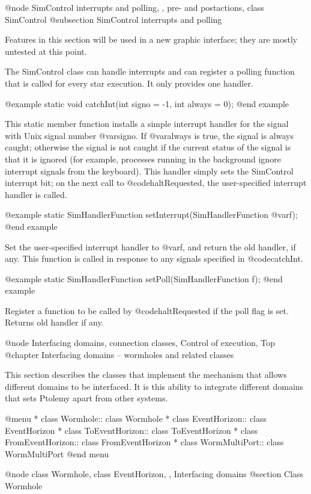@node SimControl interrupts and polling,  , pre- and postactions, class SimControl
@subsection SimControl interrupts and polling

Features in this section will be used in a new graphic interface;
they are mostly untested at this point.

The SimControl class can handle interrupts and can register a
polling function that is called for every star execution.
It only provides one handler.

@example
static void catchInt(int signo = -1, int always = 0);
@end example

This static member function installs a simple
interrupt handler for the signal with
Unix signal number @var{signo}.  If @var{always} is true, the
signal is always caught; otherwise the signal is not caught
if the current status of the signal is that it is ignored
(for example, processes running in the background ignore
interrupt signals from the keyboard).  This handler simply sets
the SimControl interrupt bit; on the next call to @code{haltRequested},
the user-specified interrupt handler is called.

@example
static SimHandlerFunction setInterrupt(SimHandlerFunction @var{f});
@end example

Set the user-specified interrupt handler to @var{f}, and return
the old handler, if any.  This function is called in response to
any signals specified in @code{catchInt}.

@example
static SimHandlerFunction setPoll(SimHandlerFunction f);
@end example

Register a function to be called by @code{haltRequested} if the poll
flag is set.  Returns old handler if any.

@node Interfacing domains, connection classes, Control of execution, Top
@chapter Interfacing domains -- wormholes and related classes

This section describes the classes that implement the mechanism that
allows different domains to be interfaced.  It is this ability to
integrate different domains that sets Ptolemy apart from other systems.

@menu
* class Wormhole::  class Wormhole
* class EventHorizon::  class EventHorizon
* class ToEventHorizon::  class ToEventHorizon
* class FromEventHorizon::  class FromEventHorizon
* class WormMultiPort::  class WormMultiPort
@end menu

@node class Wormhole, class EventHorizon,  , Interfacing domains
@section Class Wormhole

